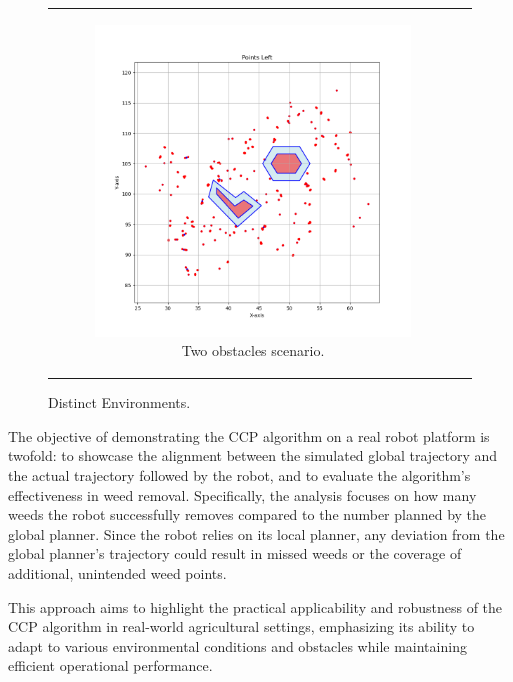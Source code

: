 \begin{figure}[H]
\begin{tabular}{cc}
\begin{subfigure}{0.4\textwidth}
            \includegraphics[width=\textwidth]{Images/real_robot/obs_scene.png}
            \caption{Two obstacles scenario.}
        \end{subfigure}
    \end{tabular}
    \caption{Distinct Environments.\label{fig:two_obs_scenario}} 
\end{figure}


\vspace{3mm}   


The objective of demonstrating the CCP algorithm on a real robot platform is twofold: to showcase the alignment between the simulated global trajectory and the actual trajectory followed by the robot, and to evaluate the algorithm's effectiveness in weed removal. Specifically, the analysis focuses on how many weeds the robot successfully removes compared to the number planned by the global planner. Since the robot relies on its local planner, any deviation from the global planner's trajectory could result in missed weeds or the coverage of additional, unintended weed points.

\vspace{3mm}   


This approach aims to highlight the practical applicability and robustness of the CCP algorithm in real-world agricultural settings, emphasizing its ability to adapt to various environmental conditions and obstacles while maintaining efficient operational performance.


